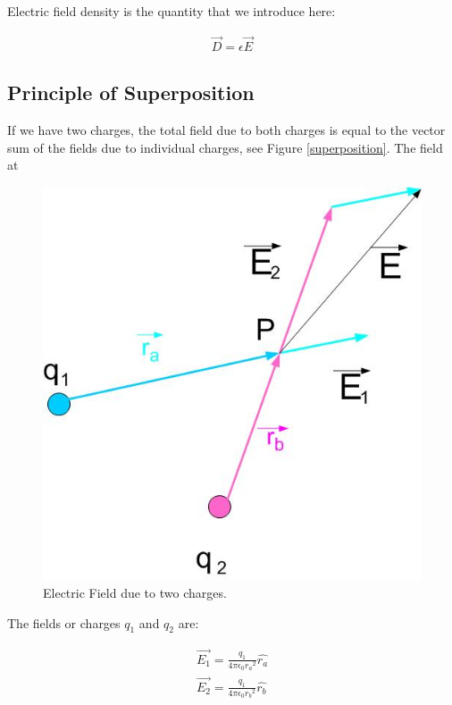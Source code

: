 \documentclass{ximera}
\begin{document}
Electric field density is the quantity that we introduce here:

\begin{eqnarray}
\vec{D}= \epsilon \vec{E}
\end{eqnarray}


\subsection{Principle of Superposition}

If we have two charges, the total field due to both charges is equal to the vector sum of the fields due to individual charges, see Figure \ref{superposition}.  The field at



\begin{figure}[htbp]
\begin{center}
\includegraphics[scale=0.5]{../jpg/superposition.jpg}
\end{center}
\caption{Electric Field due to two charges.}
\label{UnitCh}
\end{figure}

The fields or charges $q_1$ and $q_2$ are:

\begin{eqnarray}
\vec{E_1}=\frac{q_1}{4 \pi \epsilon_{0} {r_a}^2} \hat{r_a} \label{field}\\
\vec{E_2}=\frac{q_1}{4 \pi \epsilon_{0} {r_b}^2} \hat{r_b}
\end{eqnarray}
\end{document}
